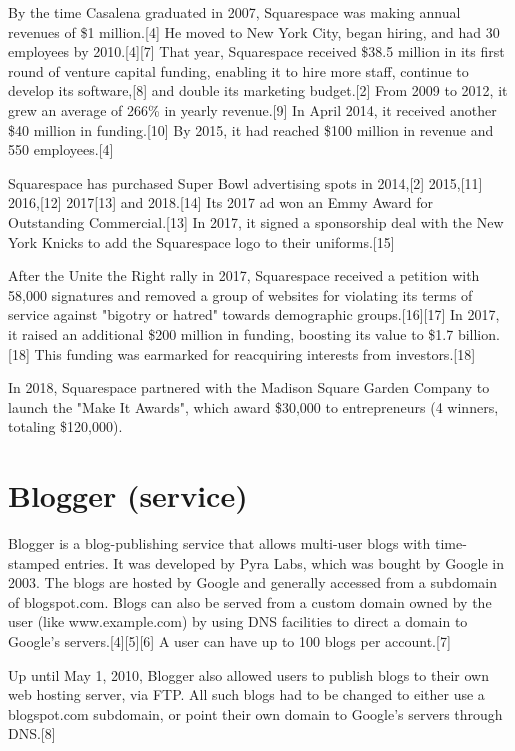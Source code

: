 \documentclass[12pt]{article}
\begin{document}
By the time Casalena graduated in 2007, Squarespace was making annual revenues of \$1 million.[4] He moved to New York City, began hiring, and had 30 employees by 2010.[4][7] That year, Squarespace received \$38.5 million in its first round of venture capital funding, enabling it to hire more staff, continue to develop its software,[8] and double its marketing budget.[2] From 2009 to 2012, it grew an average of 266\% in yearly revenue.[9] In April 2014, it received another \$40 million in funding.[10] By 2015, it had reached \$100 million in revenue and 550 employees.[4]

Squarespace has purchased Super Bowl advertising spots in 2014,[2] 2015,[11] 2016,[12] 2017[13] and 2018.[14] Its 2017 ad won an Emmy Award for Outstanding Commercial.[13] In 2017, it signed a sponsorship deal with the New York Knicks to add the Squarespace logo to their uniforms.[15]

After the Unite the Right rally in 2017, Squarespace received a petition with 58,000 signatures and removed a group of websites for violating its terms of service against "bigotry or hatred" towards demographic groups.[16][17] In 2017, it raised an additional \$200 million in funding, boosting its value to \$1.7 billion.[18] This funding was earmarked for reacquiring interests from investors.[18]

In 2018, Squarespace partnered with the Madison Square Garden Company to launch the "Make It Awards", which award \$30,000 to entrepreneurs (4 winners, totaling \$120,000).




\section{Blogger (service)}


Blogger is a blog-publishing service that allows multi-user blogs with time-stamped entries. It was developed by Pyra Labs, which was bought by Google in 2003. The blogs are hosted by Google and generally accessed from a subdomain of blogspot.com. Blogs can also be served from a custom domain owned by the user (like www.example.com) by using DNS facilities to direct a domain to Google's servers.[4][5][6] A user can have up to 100 blogs per account.[7]

Up until May 1, 2010, Blogger also allowed users to publish blogs to their own web hosting server, via FTP. All such blogs had to be changed to either use a blogspot.com subdomain, or point their own domain to Google's servers through DNS.[8] 
\end{document}
